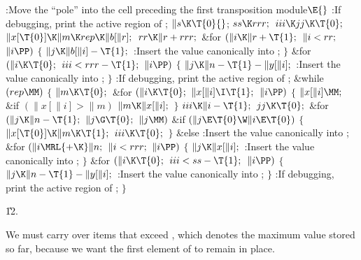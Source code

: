 \Y\B\4:Move the ``pole'' into the cell preceding the first transposition
module\X${}\E{}$\6
:If debugging, print the active region of \X;\6
${}\|s\K\T{0}{}$;\5
${}\\{ss}\K\\{rrr};{}$\6
${}\\{iii}\K\\{jj}\K\T{0};{}$\6
${}\|x[\T{0}]\K\|m\K\\{rep}\K\|b[\|r];{}$\6
${}\\{rr}\K\|r+\\{rrr};{}$\6
\&{for} ${}(\|i\K\|r+\T{1};{}$ ${}\|i<\\{rr};{}$ ${}\|i\PP){}$\5
${}\{{}$\1\6
${}\|j\K\|b[\|i]-\T{1};{}$\6
:Insert the value  canonically into \X;\6
\4${}\}{}$\2\6
\&{for} ${}(\|i\K\T{0};{}$ ${}\\{iii}<\\{rrr}-\T{1};{}$ ${}\|i\PP){}$\5
${}\{{}$\1\6
${}\|j\K\|n-\T{1}-\|y[\|i];{}$\6
:Insert the value  canonically into \X;\6
\4${}\}{}$\2\6
:If debugging, print the active region of \X;\6
\&{while} ${}(\\{rep}\MM){}$\5
${}\{{}$\1\6
${}\|m\K\T{0};{}$\6
\&{for} ${}(\|i\K\T{0};{}$ ${}\|x[\|i]\I\T{1};{}$ ${}\|i\PP){}$\5
${}\{{}$\1\6
${}\|x[\|i]\MM;{}$\6
\&{if} ${}(\|x[\|i]>\|m){}$\1\5
${}\|m\K\|x[\|i];{}$\2\6
\4${}\}{}$\2\6
${}\\{iii}\K\|i-\T{1};{}$\6
${}\\{jj}\K\T{0};{}$\6
\&{for} ${}(\|j\K\|n-\T{1};{}$ ${}\|j\G\T{0};{}$ ${}\|j\MM){}$\1\6
\&{if} ${}(\|j\E\T{0}\W\|i\E\T{0}){}$\5
${}\{{}$\1\6
${}\|x[\T{0}]\K\|m\K\T{1};{}$\6
${}\\{iii}\K\T{0};{}$\6
\4${}\}{}$\2\6
\&{else}\1\5
:Insert the value  canonically into \X;\2\2\6
\&{for} ${}(\|i\MRL{+{\K}}\|n;{}$ ${}\|i<\\{rrr};{}$ ${}\|i\PP){}$\5
${}\{{}$\1\6
${}\|j\K\|x[\|i];{}$\6
:Insert the value  canonically into \X;\6
\4${}\}{}$\2\6
\&{for} ${}(\|i\K\T{0};{}$ ${}\\{iii}<\\{ss}-\T{1};{}$ ${}\|i\PP){}$\5
${}\{{}$\1\6
${}\|j\K\|n-\T{1}-\|y[\|i];{}$\6
:Insert the value  canonically into \X;\6
\4${}\}{}$\2\6
:If debugging, print the active region of \X;\6
\4${}\}{}$\2\par
\U12.\fi

We must carry over items that exceed , which
denotes the maximum
value stored so far, because we want the first element of  to
remain
in place.

